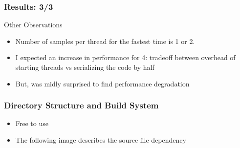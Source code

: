 \documentclass[mathserif]{beamer}
\begin{document}
\begin{frame}                                                                                                                                                                          
\frametitle{Results: 3/3}
\begin{block}{Other Observations}
\begin{itemize}
\item Number of samples per thread for the fastest time is 1 or 2.  
\item I expected an increase in performance for 4: tradeoff between overhead of starting threads vs serializing the code by half 
\item But, was midly surprised to find performance degradation 
\end{itemize}
\end{block}
\end{frame}             

\begin{frame}                                                                                                                                                                          
\frametitle{Directory Structure and Build System}
\begin{center}
\begin{itemize}
\item Free to use
\item The following image describes the source file dependency 
\end{itemize}
\end{center}
\end{frame}             
\end{document}
